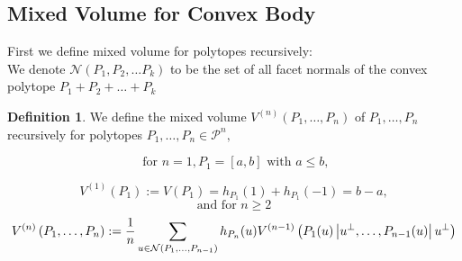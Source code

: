 \documentclass[oneside]{book}
\theoremstyle{definition}
\newtheorem{mydef}{Definition}[chapter]
\begin{document}
\subsection{Mixed Volume for Convex Body}
First we define mixed volume for polytopes recursively:  \\
We denote  $ \mathcal{N}(P_{1},P_{2},\ldots P_{k})$ to be the set of all facet normals of the convex polytope $P_{1}+P_{2}+ \ldots + P_{k}$
\begin{mydef}
We define the mixed volume $V^{(n)}\left(P_{1}, \ldots, P_{n}\right)$ of $P_{1}, \ldots, P_{n}$ recursively for polytopes $P_{1}, \ldots, P_{n} \in \mathcal{P}^{n},$ 
 
$$ \text{ for } n = 1, P_{1}=[a, b] \text { with } a \leq b,$$ 
    
  \begin{equation}
  \label{eq49}
      V^{(1)}\left(P_{1}\right):=V\left(P_{1}\right)=h_{P_{1}}(1)+h_{P_{1}}(-1) = b - a,  
  \end{equation} 
$$\text{and} \text { for } n \geq 2 $$ 
\begin{equation} \label{eq50}
\\
V^{(n)}\left(P_{1}, \ldots, P_{n}\right):=\frac{1}{n} \sum_{u \in \mathcal{N}\left(P_{1}, \ldots, P_{n-1}\right)} h_{P_{n}}(u) V^{(n-1)}\left(P_{1}(u)\left|u^{\perp}, \ldots, P_{n-1}(u)\right| u^{\perp}\right)
\end{equation}
  \end{mydef}     
\end{document}
